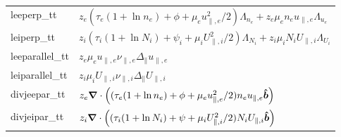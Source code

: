\begin{longtable}{ll}
    leeperp\_tt &$z_e(\tau_e(1+\ln n_e) + \phi + \mu_eu_{\parallel,e}^2/2) \Lambda_{n_e} + z_e\mu_e n_e u_{\parallel,e} \Lambda_{u_e}$ \\
    leiperp\_tt &$z_i(\tau_i(1+\ln N_i) + \psi_i + \mu_iU_{\parallel,i}^2/2) \Lambda_{N_i} + z_i\mu_i N_i U_{\parallel,i} \Lambda_{U_i}$ \\
    leeparallel\_tt & $ z_e\mu_e u_{\parallel,e} \nu_{\parallel,e} \Delta_\parallel u_{\parallel,e}$ \\
    leiparallel\_tt & $ z_i\mu_i U_{\parallel,i} \nu_{\parallel,i} \Delta_\parallel U_{\parallel,i}$ \\
    divjeepar\_tt &$ z_e{\boldsymbol{\nabla}}\cdot \left( (\tau_e(1+\ln n_e) + \phi + \mu_eu_{\parallel,e}^2/2) n_eu_{\parallel,e}\bm{\hat{b}}\right)$ \\
    divjeipar\_tt &$ z_i{\boldsymbol{\nabla}}\cdot \left( (\tau_i(1+\ln N_i) + \psi + \mu_iU_{\parallel,i}^2/2) N_iU_{\parallel,i}\bm{\hat{b}}\right)$ \\
\bottomrule
\end{longtable}

